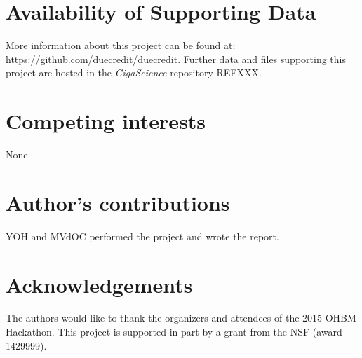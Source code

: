 \documentclass[twocolumn]{bmcart}%
\begin{document}
\begin{backmatter}

\section*{Availability of Supporting Data}
More information about this project can be found at: \url{https://github.com/duecredit/duecredit}. Further data and files supporting this project are hosted in the \emph{GigaScience} repository REFXXX.

\section*{Competing interests}
None

\section*{Author's contributions}
YOH and MVdOC performed the project and wrote the report.

\section*{Acknowledgements}
The authors would like to thank the organizers and attendees of the 2015
OHBM Hackathon. This project is supported in part by a grant from the
NSF (award 1429999).

  
  


\end{backmatter}
\end{document}
